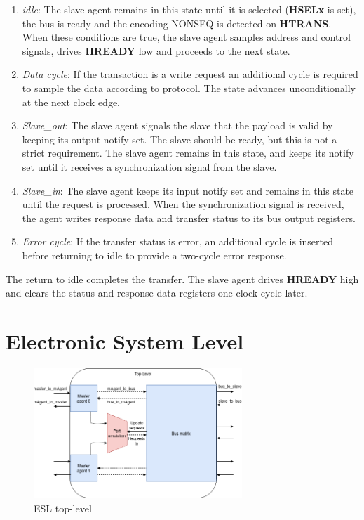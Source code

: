 \begin{enumerate}
 \item \textit{idle}: The slave agent remains in this state until it is selected (\textbf{HSELx} is set), the bus is ready and the encoding NONSEQ is detected on \textbf{HTRANS}. When these conditions are true, the slave agent samples address and control signals, drives \textbf{HREADY} low and proceeds to the next state. 
 \item \textit{Data cycle}: If the transaction is a write request an additional cycle is required to sample the data according to protocol. The state advances unconditionally at the next clock edge.
 \item \textit{Slave\_out}: The slave agent signals the slave that the payload is valid by keeping its output notify set. The slave should be ready, but this is not a strict requirement. The slave agent remains in this state, and keeps its notify set until it receives a synchronization signal from the slave.    
 \item \textit{Slave\_in}: The slave agent keeps its input notify set and remains in this state until the request is processed. When the synchronization signal is received, the agent writes response data and transfer status to its bus output registers. 
 \item \textit{Error cycle}: If the transfer status is error, an additional cycle is inserted before returning to idle to provide a two-cycle error response. 
\end{enumerate}

The return to idle completes the transfer. The slave agent drives \textbf{HREADY} high and clears the status and response data registers one clock cycle later. 
\newpage 

\section{Electronic System Level}
\label{sec:syslev}
\begin{figure}[hbt]
    \begin{center}
        \includegraphics[width=0.7\textwidth]{figs/ESL/syslev_new.png}
    \end{center}
    \caption{ESL top-level}
    \label{fig:esl-top}
\end{figure}

